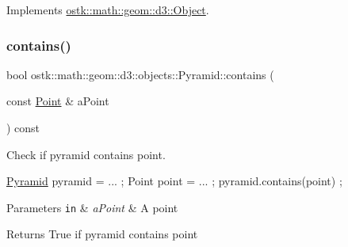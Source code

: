 Implements \hyperlink{classostk_1_1math_1_1geom_1_1d3_1_1_object_a676013f9555f6492687f9809b2db887b}{ostk\+::math\+::geom\+::d3\+::\+Object}.

\mbox{\label{classostk_1_1math_1_1geom_1_1d3_1_1objects_1_1_pyramid_a7f476c37cc3f014bdc24e7fa4f2da743}} 
\subsubsection{\texorpdfstring{contains()}{contains()}\hspace{0.1cm}{\footnotesize\ttfamily [1/2]}}
{\footnotesize\ttfamily bool ostk\+::math\+::geom\+::d3\+::objects\+::\+Pyramid\+::contains (\begin{DoxyParamCaption}\item[{const \hyperlink{classostk_1_1math_1_1geom_1_1d3_1_1objects_1_1_point}{Point} \&}]{a\+Point }\end{DoxyParamCaption}) const}



Check if pyramid contains point. 


\begin{DoxyCode}
\hyperlink{classostk_1_1math_1_1geom_1_1d3_1_1objects_1_1_pyramid_a5560d123994714b36d4737b358dadcea}{Pyramid} pyramid = ... ;
Point point = ... ;
pyramid.contains(point) ;
\end{DoxyCode}



\begin{DoxyParams}[1]{Parameters}
\mbox{\tt in}  & {\em a\+Point} & A point \\
\hline
\end{DoxyParams}
\begin{DoxyReturn}{Returns}
True if pyramid contains point 
\end{DoxyReturn}
\mbox{\label{classostk_1_1math_1_1geom_1_1d3_1_1objects_1_1_pyramid_a761592bada278f4a80f910e3e234fde8}} 
